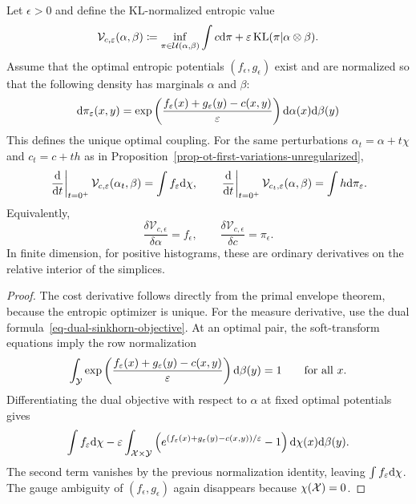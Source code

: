 \begin{prop}\label{prop-ot-first-variations-entropic}
	Let $\epsilon>0$ and define the KL-normalized entropic value
	\[
		\mathcal V_{c,\varepsilon}(\alpha,\beta)
		\coloneqq
		\inf_{\pi\in\mathcal{U}(\alpha,\beta)}
		\int c\mathrm{d}\pi+\varepsilon\operatorname{KL}(\pi|\alpha\otimes\beta).
	\]
	Assume that the optimal entropic potentials $(f_\epsilon,g_\epsilon)$ exist and are normalized so that the following density has marginals $\alpha$ and $\beta$:
	\[
		\mathrm{d}\pi_\varepsilon(x,y)
		=
		\exp\left( \frac{f_\varepsilon(x)+g_\varepsilon(y)-c(x,y)}{\varepsilon} \right)
		\mathrm{d}\alpha(x)\mathrm{d}\beta(y)
	\]
	This defines the unique optimal coupling. For the same perturbations $\alpha_t=\alpha+t\chi$ and $c_t=c+th$ as in Proposition~\ref{prop-ot-first-variations-unregularized},
	\[
		\left.\frac{\mathrm{d}}{\mathrm{d} t}\right|_{t=0^+}
		\mathcal V_{c,\varepsilon}(\alpha_t,\beta)
		=
		\int f_\varepsilon\mathrm{d}\chi,
		\qquad
		\left.\frac{\mathrm{d}}{\mathrm{d} t}\right|_{t=0^+}
		\mathcal V_{c_t,\varepsilon}(\alpha,\beta)
		=
		\int h\mathrm{d}\pi_\varepsilon .
	\]
	Equivalently,
	\[
		\frac{\delta \mathcal V_{c,\epsilon}}{\delta\alpha}=f_\epsilon,
		\qquad
		\frac{\delta \mathcal V_{c,\epsilon}}{\delta c}=\pi_\epsilon .
	\]
	In finite dimension, for positive histograms, these are ordinary derivatives on the relative interior of the simplices.
\end{prop}
\begin{proof}
	The cost derivative follows directly from the primal envelope theorem, because the entropic optimizer is unique. For the measure derivative, use the dual formula~\eqref{eq-dual-sinkhorn-objective}. At an optimal pair, the soft-transform equations imply the row normalization
	\[
		\int_{\mathcal{Y}}
		\exp\left( \frac{f_\varepsilon(x)+g_\varepsilon(y)-c(x,y)}{\varepsilon} \right)
		\mathrm{d}\beta(y)
		=1
		\qquad\text{for all }x.
	\]
	Differentiating the dual objective with respect to $\alpha$ at fixed optimal potentials gives
	\[
		\int f_\varepsilon\mathrm{d}\chi
		-
		\varepsilon
		\int_{\mathcal{X}\times\mathcal{Y}}
		\left( 
		e^{(f_\varepsilon(x)+g_\varepsilon(y)-c(x,y))/\varepsilon}-1
		 \right)
		\mathrm{d}\chi(x)\mathrm{d}\beta(y).
	\]
	The second term vanishes by the previous normalization identity, leaving $\int f_\varepsilon\mathrm{d}\chi$. The gauge ambiguity of $(f_\epsilon,g_\epsilon)$ again disappears because $\chi(\mathcal{X})=0$.
\end{proof}

